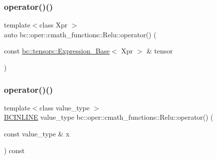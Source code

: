 \mbox{\label{structbc_1_1oper_1_1cmath__functions_1_1Relu_a1ee5d3be431e92708d3ca56c437de8a8}} 
\subsubsection{\texorpdfstring{operator()()}{operator()()}\hspace{0.1cm}{\footnotesize\ttfamily [2/3]}}
{\footnotesize\ttfamily template$<$class Xpr $>$ \\
auto bc\+::oper\+::cmath\+\_\+functions\+::\+Relu\+::operator() (\begin{DoxyParamCaption}\item[{const \hyperlink{classbc_1_1tensors_1_1Expression__Base}{bc\+::tensors\+::\+Expression\+\_\+\+Base}$<$ Xpr $>$ \&}]{tensor }\end{DoxyParamCaption})\hspace{0.3cm}{\ttfamily [inline]}}

\mbox{\label{structbc_1_1oper_1_1cmath__functions_1_1Relu_a478ddb6722ae034ef9246f69ba9afd6b}} 
\subsubsection{\texorpdfstring{operator()()}{operator()()}\hspace{0.1cm}{\footnotesize\ttfamily [3/3]}}
{\footnotesize\ttfamily template$<$class value\+\_\+type $>$ \\
\hyperlink{common_8h_a6699e8b0449da5c0fafb878e59c1d4b1}{B\+C\+I\+N\+L\+I\+NE} value\+\_\+type bc\+::oper\+::cmath\+\_\+functions\+::\+Relu\+::operator() (\begin{DoxyParamCaption}\item[{const value\+\_\+type \&}]{x }\end{DoxyParamCaption}) const\hspace{0.3cm}{\ttfamily [inline]}}



